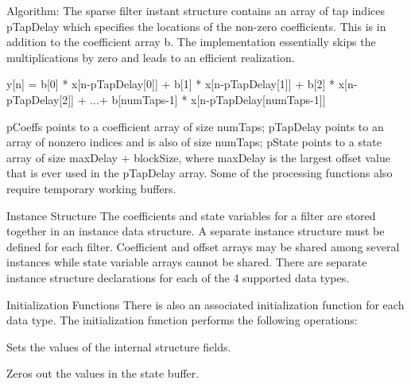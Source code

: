 \begin{DoxyParagraph}{Algorithm\-: }
The sparse filter instant structure contains an array of tap indices {\ttfamily p\-Tap\-Delay} which specifies the locations of the non-\/zero coefficients. This is in addition to the coefficient array {\ttfamily b}. The implementation essentially skips the multiplications by zero and leads to an efficient realization. 
\begin{DoxyPre}   
      y[n] = b[0] * x[n-pTapDelay[0]] + b[1] * x[n-pTapDelay[1]] + b[2] * x[n-pTapDelay[2]] + ...+ b[numTaps-1] * x[n-pTapDelay[numTaps-1]]    
  \end{DoxyPre}
 
\end{DoxyParagraph}
\begin{DoxyParagraph}{}
 
\end{DoxyParagraph}
\begin{DoxyParagraph}{}
{\ttfamily p\-Coeffs} points to a coefficient array of size {\ttfamily num\-Taps}; {\ttfamily p\-Tap\-Delay} points to an array of nonzero indices and is also of size {\ttfamily num\-Taps}; {\ttfamily p\-State} points to a state array of size {\ttfamily max\-Delay + block\-Size}, where {\ttfamily max\-Delay} is the largest offset value that is ever used in the {\ttfamily p\-Tap\-Delay} array. Some of the processing functions also require temporary working buffers.
\end{DoxyParagraph}
\begin{DoxyParagraph}{Instance Structure }
The coefficients and state variables for a filter are stored together in an instance data structure. A separate instance structure must be defined for each filter. Coefficient and offset arrays may be shared among several instances while state variable arrays cannot be shared. There are separate instance structure declarations for each of the 4 supported data types.
\end{DoxyParagraph}
\begin{DoxyParagraph}{Initialization Functions }
There is also an associated initialization function for each data type. The initialization function performs the following operations\-:
\begin{DoxyItemize}
\item Sets the values of the internal structure fields.
\item Zeros out the values in the state buffer.
\end{DoxyItemize}
\end{DoxyParagraph}
